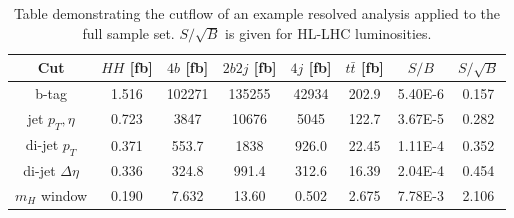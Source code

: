 \documentclass[12pt]{article}
\begin{document}
\begin{table}[htdp]
\begin{center}
\begin{tabular}{|c||c||c|c|c|c||c|c|}
\hline
Cut 					& $HH$ [fb] & $4b$ [fb] & $2b2j$ [fb] & $4j$ [fb] & $t\bar{t}$ [fb] & $S/B$ & $S/\sqrt{B}$ \\
\hline
\hline
b-tag    	& 1.516 &      102271         & 135255        & 42934  	&	202.9	&5.40E-6	& 0.157\\
jet $p_T,\eta$         & 0.723 &        3847      & 10676       & 5045 	&	122.7	&3.67E-5	& 0.282\\
di-jet $p_T$           	& 0.371&      553.7        & 1838	  & 926.0	&	22.45	&1.11E-4	& 0.352\\
di-jet $\Delta\eta$   & 0.336&       324.8       & 991.4 	  & 312.6		&	16.39	&2.04E-4	& 0.454\\
\hline
$m_H$ window   &0.190 &          7.632      & 13.60	  & 0.502	&	2.675	&7.78E-3	& 2.106\\
\hline
\end{tabular}
\end{center}
\caption{Table demonstrating the cutflow of an example resolved analysis applied to the full sample set.  $S/\sqrt{B}$ is given for HL-LHC luminosities.}
\label{tab:resCutflow}
\end{table}%
\end{document}
